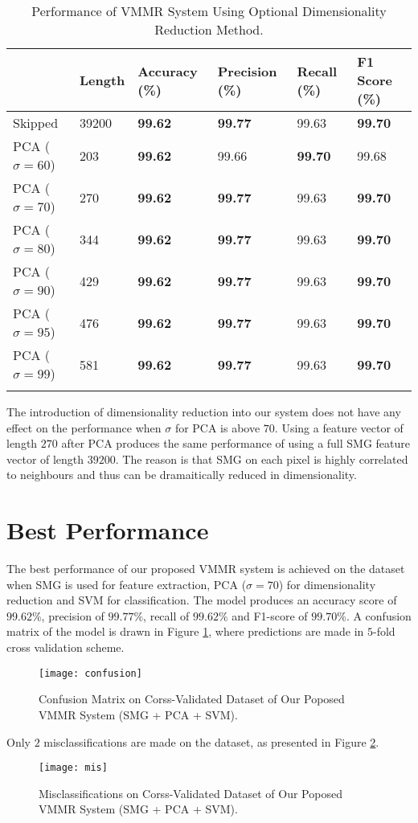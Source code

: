 \begin{longtable}[]{@{}llllll@{}}
\toprule
& Length & Accuracy (\%) & Precision (\%) & Recall (\%) & F1 Score
(\%)\tabularnewline
\midrule
\endhead
Skipped & 39200 & \textbf{99.62} & \textbf{99.77} & 99.63 &
\textbf{99.70}\tabularnewline
PCA (\(\sigma=60\)) & 203 & \textbf{99.62} & 99.66 & \textbf{99.70} &
99.68\tabularnewline
PCA (\(\sigma=70\)) & 270 & \textbf{99.62} & \textbf{99.77} & 99.63 &
\textbf{99.70}\tabularnewline
PCA (\(\sigma=80\)) & 344 & \textbf{99.62} & \textbf{99.77} & 99.63 &
\textbf{99.70}\tabularnewline
PCA (\(\sigma=90\)) & 429 & \textbf{99.62} & \textbf{99.77} & 99.63 &
\textbf{99.70}\tabularnewline
PCA (\(\sigma=95\)) & 476 & \textbf{99.62} & \textbf{99.77} & 99.63 &
\textbf{99.70}\tabularnewline
PCA (\(\sigma=99\)) & 581 & \textbf{99.62} & \textbf{99.77} & 99.63 &
\textbf{99.70}\tabularnewline
\bottomrule
\caption{Performance of VMMR System Using Optional Dimensionality Reduction Method.}
\label{tab:pca}
\end{longtable}

The introduction of dimensionality reduction into our system does not have any effect on the performance when $\sigma$ for PCA is above $70$.
Using a feature vector of length $270$ after PCA produces the same performance of using a full SMG feature vector of length $39200$.
The reason is that SMG on each pixel is highly correlated to neighbours and thus can be dramaitically reduced in dimensionality.


\section{Best Performance}

The best performance of our proposed VMMR system is achieved on the dataset when SMG is used for feature extraction, PCA ($\sigma = 70$) for dimensionality reduction and SVM for classification.
The model produces an accuracy score of $99.62\%$, precision of $99.77\%$, recall of $99.62\%$ and F1-score of $99.70\%$.
A confusion matrix of the model is drawn in Figure \ref{fig:confusion}, where predictions are made in $5$-fold cross validation scheme.

\begin{figure}
\centering
\texttt{[image: confusion]}
\caption{Confusion Matrix on Corss-Validated Dataset of Our Poposed VMMR System (SMG + PCA + SVM).}
\label{fig:confusion}
\end{figure}

Only $2$ misclassifications are made on the dataset, as presented in Figure \ref{fig:mis}. 

\begin{figure}
\centering
\texttt{[image: mis]}
\caption{Misclassifications on Corss-Validated Dataset of Our Poposed VMMR System (SMG + PCA + SVM).}
\label{fig:mis}
\end{figure}


